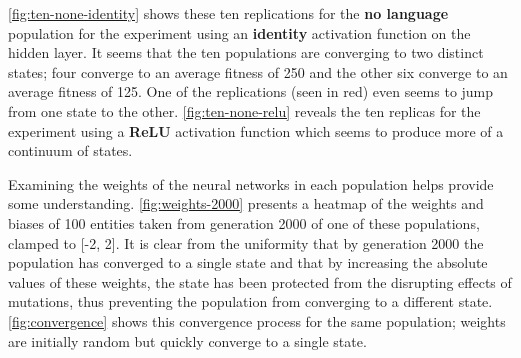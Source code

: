 \documentclass[12pt,a4paper]{report}
\begin{document}
\cref{fig:ten-none-identity} shows these ten replications for the {\bf no language} population for the experiment using an {\bf identity} activation function on the hidden layer. It seems that the ten populations are converging to two distinct states; four converge to an average fitness of 250 and the other six converge to an average fitness of 125. One of the replications (seen in red) even seems to jump from one state to the other. \cref{fig:ten-none-relu} reveals the ten replicas for the experiment using a {\bf ReLU} activation function which seems to produce more of a continuum of states.

Examining the weights of the neural networks in each population helps provide some understanding. \cref{fig:weights-2000} presents a heatmap of the weights and biases of 100 entities taken from generation 2000 of one of these populations, clamped to [-2, 2]. It is clear from the uniformity that by generation 2000 the population has converged to a single state and that by increasing the absolute values of these weights, the state has been protected from the disrupting effects of mutations, thus preventing the population from converging to a different state. \cref{fig:convergence} shows this convergence process for the same population; weights are initially random but quickly converge to a single state.
\end{document}
